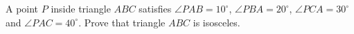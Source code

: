 A point $P$ inside triangle $ABC$ satisfies $\angle PAB=10^\circ$, $\angle PBA=20^\circ$, $\angle PCA=30^\circ$ and $\angle PAC=40^\circ$. Prove that triangle $ABC$ is isosceles.

